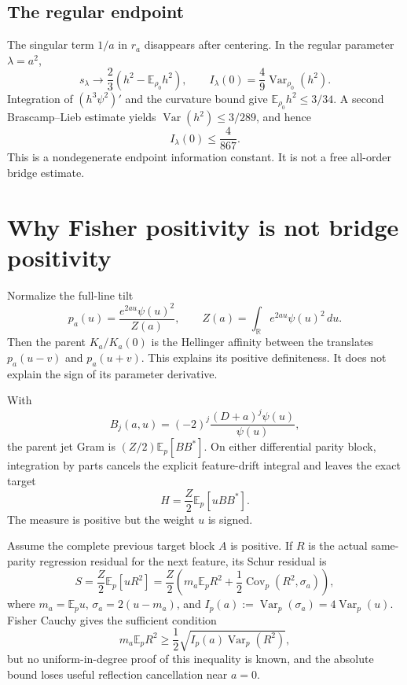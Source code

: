 \documentclass[11pt]{article}
\theoremstyle{definition}
\theoremstyle{remark}
\newcommand{\R}{\mathbb{R}}
\newcommand{\E}{\mathbb{E}}
\newcommand{\Var}{\operatorname{Var}}
\newcommand{\Cov}{\operatorname{Cov}}
\begin{document}
\subsection{The regular endpoint}

The singular term $1/a$ in $r_a$ disappears after centering. In the regular
parameter $\lambda=a^2$,
\begin{equation}
 s_\lambda\longrightarrow\frac23(h^2-\E_{\rho_0}h^2),
 \qquad
 I_\lambda(0)=\frac49\Var_{\rho_0}(h^2).
\end{equation}
Integration of $(h^3\psi^2)'$ and the curvature bound give
$\E_{\rho_0}h^2\le3/34$. A second Brascamp--Lieb estimate yields
$\Var(h^2)\le3/289$, and hence
\begin{equation}
 I_\lambda(0)\le\frac4{867}.
 \label{eq:endpoint}
\end{equation}
This is a nondegenerate endpoint information constant. It is not a free
all-order bridge estimate.

\section{Why Fisher positivity is not bridge positivity}

Normalize the full-line tilt
\begin{equation}
 p_a(u)=\frac{e^{2au}\psi(u)^2}{Z(a)},
 \qquad Z(a)=\int_\R e^{2au}\psi(u)^2\,du.
\end{equation}
Then the parent $K_a/K_a(0)$ is the Hellinger affinity between the translates
$p_a(u-v)$ and $p_a(u+v)$. This explains its positive definiteness. It does not
explain the sign of its parameter derivative.

With
\begin{equation}
 B_j(a,u)=(-2)^j\frac{(D+a)^j\psi(u)}{\psi(u)},
\end{equation}
the parent jet Gram is $(Z/2)\E_p[BB^*]$. On either differential parity block,
integration by parts cancels the explicit feature-drift integral and leaves
the exact target
\begin{equation}
 H=\frac Z2\E_p[uBB^*].
 \label{eq:signed-u}
\end{equation}
The measure is positive but the weight $u$ is signed.

Assume the complete previous target block $A$ is positive. If $R$ is the actual
same-parity regression residual for the next feature, its Schur residual is
\begin{equation}
 S=\frac Z2\E_p[uR^2]
  =\frac Z2\left(m_a\E_pR^2+\frac12\Cov_p(R^2,\sigma_a)\right),
 \label{eq:signed-schur}
\end{equation}
where $m_a=\E_pu$, $\sigma_a=2(u-m_a)$, and
$I_p(a):=\Var_p(\sigma_a)=4\Var_p(u)$. Fisher Cauchy gives the sufficient
condition
\begin{equation}
 m_a\E_pR^2\ge\frac12\sqrt{I_p(a)\Var_p(R^2)},
\end{equation}
but no uniform-in-degree proof of this inequality is known, and the absolute
bound loses useful reflection cancellation near $a=0$.
\end{document}
